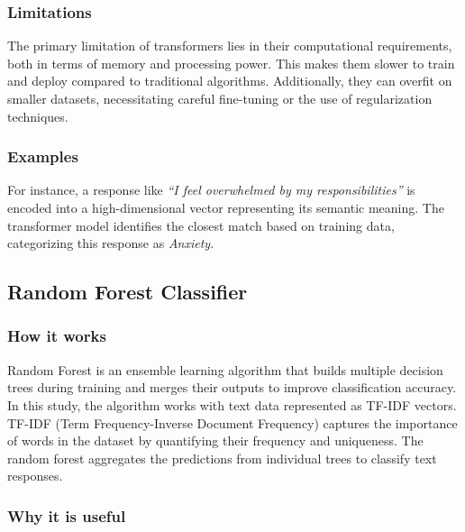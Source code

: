 \documentclass[runningheads,a4paper,11pt]{report}
\begin{document}
\subsubsection{Limitations}
\label{subsubsection:transformers_limitations}

The primary limitation of transformers lies in their computational requirements, both in terms of memory and processing power. This makes them slower to train and deploy compared to traditional algorithms. Additionally, they can overfit on smaller datasets, necessitating careful fine-tuning or the use of regularization techniques.

\subsubsection{Examples}
\label{subsubsection:transformers_examples}

For instance, a response like \textit{``I feel overwhelmed by my responsibilities''} is encoded into a high-dimensional vector representing its semantic meaning. The transformer model identifies the closest match based on training data, categorizing this response as \textit{Anxiety}.

\subsection{Random Forest Classifier}
\label{subsection:random_forest}

\subsubsection{How it works}
\label{subsubsection:random_forest_how_it_works}

Random Forest is an ensemble learning algorithm that builds multiple decision trees during training and merges their outputs to improve classification accuracy. In this study, the algorithm works with text data represented as TF-IDF vectors. TF-IDF (Term Frequency-Inverse Document Frequency) captures the importance of words in the dataset by quantifying their frequency and uniqueness. The random forest aggregates the predictions from individual trees to classify text responses.

\subsubsection{Why it is useful}
\label{subsubsection:random_forest_why_useful}
\end{document}
